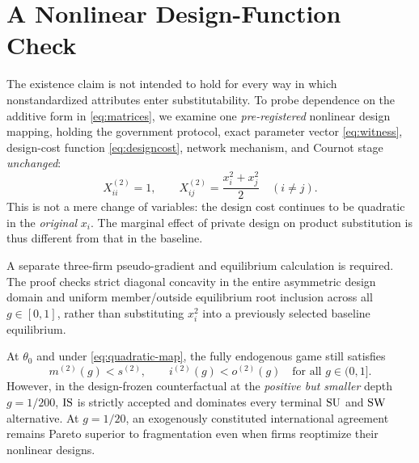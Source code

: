 \section{A Nonlinear Design-Function Check}\label{sec:robustness}

The existence claim is not intended to hold for every way
in which nonstandardized attributes enter substitutability.
To probe dependence on the additive form in
\eqref{eq:matrices}, we examine one
\emph{pre-registered} nonlinear design mapping, holding
the government protocol, exact parameter vector
\eqref{eq:witness}, design-cost function \eqref{eq:designcost},
network mechanism, and Cournot stage \emph{unchanged}:
\begin{equation}\label{eq:quadratic-map}
 X^{(2)}_{ii}=1,\qquad
 X^{(2)}_{ij}=\frac{x_i^2+x_j^2}{2}\quad (i\ne j).
\end{equation}
This is not a mere change of variables: the design cost
continues to be quadratic in the \emph{original} $x_i$.
The marginal effect of private design on product substitution
is thus different from that in the baseline.

A separate three-firm pseudo-gradient and equilibrium
calculation is required. The proof checks strict diagonal
concavity in the entire asymmetric design domain and
uniform member/outside equilibrium root inclusion across
all $g\in[0,1]$, rather than substituting $x_i^2$
into a previously selected baseline equilibrium.

\begin{proposition}
\label{prop:quadratic}
At $\theta_0$ and under \eqref{eq:quadratic-map},
the fully endogenous game still satisfies
\[
 m^{(2)}(g)<s^{(2)},\qquad
 i^{(2)}(g)<o^{(2)}(g)\quad\text{for all }g\in(0,1].
\]
However, in the design-frozen counterfactual at the
\emph{positive but smaller} depth $g=1/200$, $\mathrm{IS}$
is strictly accepted and dominates every terminal
$\mathrm{SU}$ and $\mathrm{SW}$ alternative. At $g=1/20$,
an exogenously constituted international agreement
remains Pareto superior to fragmentation even when
firms reoptimize their nonlinear designs.
\end{proposition}

